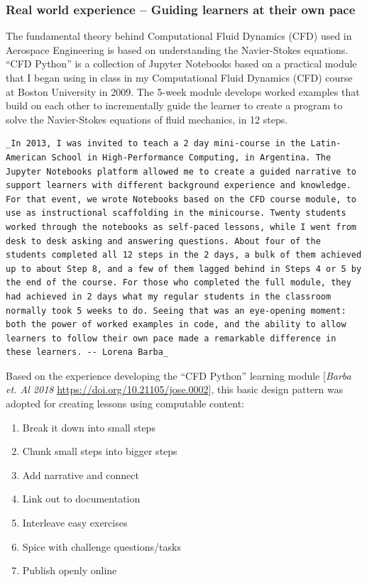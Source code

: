 \documentclass[]{book}
\providecommand{\tightlist}{%
  \setlength{\itemsep}{0pt}\setlength{\parskip}{0pt}}
\begin{document}
\subsubsection{Real world experience -- Guiding learners at their own
pace}\label{real-world-experience-guiding-learners-at-their-own-pace}

The fundamental theory behind Computational Fluid Dynamics (CFD) used in
Aerospace Engineering is based on understanding the Navier-Stokes
equations. ``CFD Python'' is a collection of Jupyter Notebooks based on
a practical module that I began using in class in my Computational Fluid
Dynamics (CFD) course at Boston University in 2009. The 5-week module
develops worked examples that build on each other to incrementally guide
the learner to create a program to solve the Navier-Stokes equations of
fluid mechanics, in 12 steps.

\begin{verbatim}
_In 2013, I was invited to teach a 2 day mini-course in the Latin-American School in High-Performance Computing, in Argentina. The Jupyter Notebooks platform allowed me to create a guided narrative to support learners with different background experience and knowledge. For that event, we wrote Notebooks based on the CFD course module, to use as instructional scaffolding in the minicourse. Twenty students worked through the notebooks as self-paced lessons, while I went from desk to desk asking and answering questions. About four of the students completed all 12 steps in the 2 days, a bulk of them achieved up to about Step 8, and a few of them lagged behind in Steps 4 or 5 by the end of the course. For those who completed the full module, they had achieved in 2 days what my regular students in the classroom normally took 5 weeks to do. Seeing that was an eye-opening moment: both the power of worked examples in code, and the ability to allow learners to follow their own pace made a remarkable difference in these learners. -- Lorena Barba_
\end{verbatim}

Based on the experience developing the ``CFD Python'' learning module
{[}\emph{Barba et. Al 2018 }\url{https://doi.org/10.21105/jose.0002}{]},
this basic design pattern was adopted for creating lessons using
computable content:

\begin{enumerate}
\def\labelenumi{\arabic{enumi}.}
\tightlist
\item
  Break it down into small steps
\item
  Chunk small steps into bigger steps
\item
  Add narrative and connect
\item
  Link out to documentation
\item
  Interleave easy exercises
\item
  Spice with challenge questions/tasks
\item
  Publish openly online
\end{enumerate}
\end{document}

